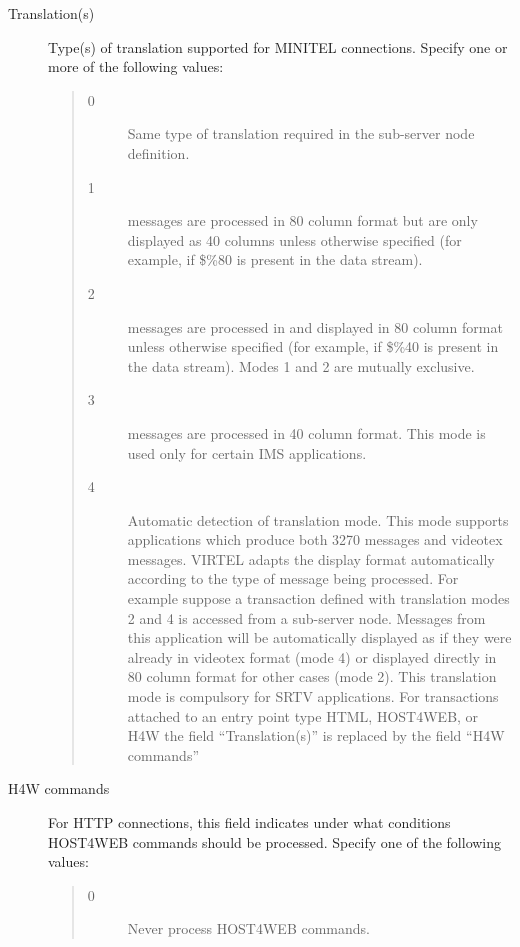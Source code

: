 \documentclass[letterpaper,10pt,english]{sphinxmanual}
\begin{document}
\begin{description}
\begin{quote}
\begin{description}
\end{description}
\end{quote}

\item[{Translation(s)}] \leavevmode
Type(s) of translation supported for MINITEL connections. Specify one or more of the following values:
\begin{quote}
\begin{description}
\item[{0}] \leavevmode
Same type of translation required in the sub-server node definition.

\item[{1}]  messages are processed in 80 column format but are only displayed as 40 columns unless otherwise specified (for example, if \$\%80 is present in the data stream).

\item[{2}]  messages are processed in and displayed in 80 column format unless otherwise specified (for example, if \$\%40 is present in the data stream).
Modes 1 and 2 are mutually exclusive.

\item[{3}]  messages are processed in 40 column format. This mode is used only for certain IMS applications.

\item[{4}] \leavevmode
Automatic detection of translation mode.
This mode supports applications which produce both 3270 messages and videotex messages. VIRTEL adapts the display format automatically according to the type of message being processed. For example suppose a transaction defined with translation modes 2 and 4 is accessed from a sub-server node. Messages from this application will be automatically displayed as if they were already in videotex format (mode 4) or displayed directly in 80 column format for other cases (mode 2).
This translation mode is compulsory for SRTV applications.
For transactions attached to an entry point type HTML, HOST4WEB, or H4W the field “Translation(s)” is replaced by the field “H4W commands”

\end{description}
\end{quote}

\item[{H4W commands}] \leavevmode
For HTTP connections, this field indicates under what conditions HOST4WEB commands should be processed. Specify one of the following values:
\begin{quote}
\begin{description}
\item[{0}] \leavevmode
Never process HOST4WEB commands.


\end{description}
\end{quote}
\end{description}
\end{document}
